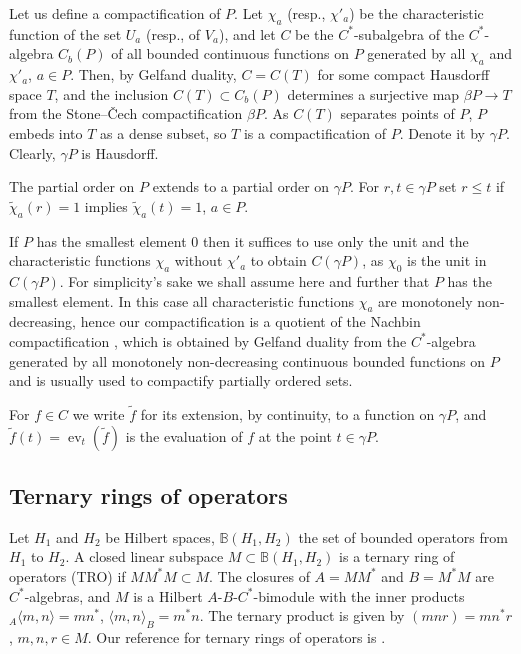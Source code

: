 \documentclass[12pt]{amsart}
\theoremstyle{definition}
\newcommand{\til}{\widetilde}
\newcommand{\ev}{\operatorname{ev}}
\begin{document}
Let us define a compactification of $P$.
Let $\chi_a$ (resp., $\chi'_a$) be the characteristic function of the set $U_a$ (resp., of $V_a$), and let $C$ be the $C^*$-subalgebra of the $C^*$-algebra $C_b(P)$ of all bounded continuous functions on $P$ generated by all $\chi_a$ and $\chi'_a$, $a\in P$. Then, by Gelfand duality, $C=C(T)$ for some compact Hausdorff space $T$, and the inclusion $C(T)\subset C_b(P)$ determines a surjective map $\beta P\to T$ from the Stone--\v Cech compactification $\beta P$. As $C(T)$ separates points of $P$, $P$ embeds into $T$ as a dense subset, so $T$ is a compactification of $P$. Denote it by $\gamma P$. Clearly, $\gamma P$ is Hausdorff. 

The partial order on $P$ extends to a partial order on $\gamma P$. For $r,t\in\gamma P$ set $r\leq t$ if $\til\chi_a(r)=1$ implies $\til\chi_a(t)=1$, $a\in P$. 

If $P$ has the smallest element 0 then it suffices to use only the unit and the characteristic functions $\chi_a$ without $\chi'_a$ to obtain $C(\gamma P)$, as $\chi_0$ is the unit in $C(\gamma P)$. For simplicity's sake we shall assume here and further that $P$ has the smallest element. In this case all characteristic functions $\chi_a$ are monotonely non-decreasing, hence our compactification is a quotient of the Nachbin compactification \cite{Nachbin}, which is obtained by Gelfand duality from the $C^*$-algebra generated by all monotonely non-decreasing continuous bounded functions on $P$ and is usually used to compactify partially ordered sets. 

For $f\in C$ we write $\til f$ for its extension, by continuity, to a function on $\gamma P$, and $\til f(t)=\ev_t(\til f)$ is the evaluation of $f$ at the point $t\in\gamma P$.



  



\subsection{Ternary rings of operators}

Let $H_1$ and $H_2$ be Hilbert spaces, $\mathbb B(H_1,H_2)$ the set of bounded operators from $H_1$ to $H_2$. A closed linear subspace $M\subset\mathbb B(H_1,H_2)$ is a ternary ring of operators (TRO) if $MM^*M\subset M$. The closures of $A=MM^*$ and $B=M^*M$ are $C^*$-algebras, and $M$ is a Hilbert $A$-$B$-$C^*$-bimodule with the inner products ${}_A\langle m,n\rangle=mn^*$, $\langle m,n\rangle_B=m^*n$. The ternary product is given by $(mnr)=mn^*r$, $m,n,r\in M$. Our reference for ternary rings of operators is \cite{TRO}. 
\end{document}
